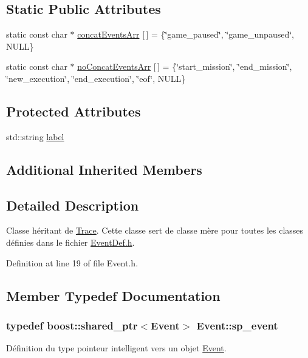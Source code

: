 \subsection*{Static Public Attributes}
\begin{DoxyCompactItemize}
\item 
static const char $\ast$ \hyperlink{class_event_a27d769cc30bbd8d827124958a9a95cae}{concat\+Events\+Arr} \mbox{[}$\,$\mbox{]} = \{\char`\"{}game\+\_\+paused\char`\"{}, \char`\"{}game\+\_\+unpaused\char`\"{}, N\+U\+LL\}
\item 
static const char $\ast$ \hyperlink{class_event_aaf275d46129b6cda2a84b905550349f2}{no\+Concat\+Events\+Arr} \mbox{[}$\,$\mbox{]} = \{\char`\"{}start\+\_\+mission\char`\"{}, \char`\"{}end\+\_\+mission\char`\"{}, \char`\"{}new\+\_\+execution\char`\"{}, \char`\"{}end\+\_\+execution\char`\"{}, \char`\"{}eof\char`\"{}, N\+U\+LL\}
\end{DoxyCompactItemize}
\subsection*{Protected Attributes}
\begin{DoxyCompactItemize}
\item 
std\+::string \hyperlink{class_event_a8d9ecffd91cc944bee314f83260713ff}{label}
\end{DoxyCompactItemize}
\subsection*{Additional Inherited Members}


\subsection{Detailed Description}
Classe héritant de \hyperlink{class_trace}{Trace}. Cette classe sert de classe mère pour toutes les classes définies dans le fichier \hyperlink{_event_def_8h}{Event\+Def.\+h}. 

Definition at line 19 of file Event.\+h.



\subsection{Member Typedef Documentation}
\subsubsection[{\texorpdfstring{sp\+\_\+event}{sp_event}}]{\setlength{\rightskip}{0pt plus 5cm}typedef boost\+::shared\+\_\+ptr$<${\bf Event}$>$ {\bf Event\+::sp\+\_\+event}}\hypertarget{class_event_af09ed5d4baca5790d6decf72075dfe13}{}\label{class_event_af09ed5d4baca5790d6decf72075dfe13}
Définition du type pointeur intelligent vers un objet \hyperlink{class_event}{Event}. 

